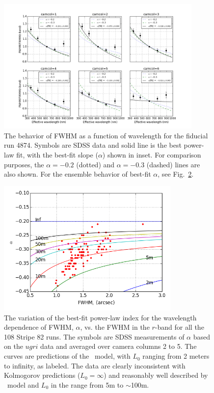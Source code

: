 \begin{figure}[th]
\centering
\includegraphics[width=0.9\textwidth]{FIGURES/fwhm_lambda.png}
\caption{The behavior of FWHM as a function of wavelength for the fiducial run 4874.
Symbols are SDSS data and solid line is the best power-law fit, with the best-fit slope
($\alpha$) shown in inset. For comparison purposes, the $\alpha=-0.2$ (dotted) and $\alpha=-0.3$ 
(dashed) lines are also shown. For the ensemble behavior of best-fit $\alpha$, see Fig.~\ref{fig:alpha_fwhm}. 
\label{fig:fwhm_lambda}}
\end{figure}


\begin{figure}[th]
\centering
\includegraphics[width=0.8\textwidth]{FIGURES/alpha_fwhm.png}
\caption{The variation of the best-fit power-law index for the wavelength dependence of FWHM, $\alpha$, 
vs. the FWHM in the $r$-band for all the 108 Stripe 82 runs. The symbols are SDSS
measurements of $\alpha$ based on the $ugri$ data and averaged over camera columns 2 to 5. 
The curves are predictions of the 
\vk~model, with $L_0$ ranging from 2 meters to infinity, as labeled. The data are clearly
inconsistent with Kolmogorov predictions ($L_0=\infty$) and reasonably well described by
\vk~model and $L_0$ in the range from 5m to $\sim$100m.  \label{fig:alpha_fwhm}}
\end{figure}

